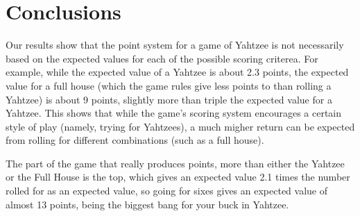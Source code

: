 \section{Conclusions}

Our results show that the point system for a game of Yahtzee is not necessarily
based on the expected values for each of the possible scoring criterea.
For example, while the expected value of a Yahtzee is about 2.3 points, the expected
value for a full house (which the game rules give less points to than rolling
a Yahtzee) is about 9 points, slightly more than triple the expected value for a Yahtzee.
This shows that while the game's scoring system encourages a certain style of
play (namely, trying for Yahtzees), a much migher return can be expected from
rolling for different combinations (such as a full house).

The part of the game that really produces points, more than either the Yahtzee or the Full House is the top, which gives an expected value 2.1 times the number rolled for as an expected value, so going for sixes gives an expected value of almost 13 points, being the biggest bang for your buck in Yahtzee. 
